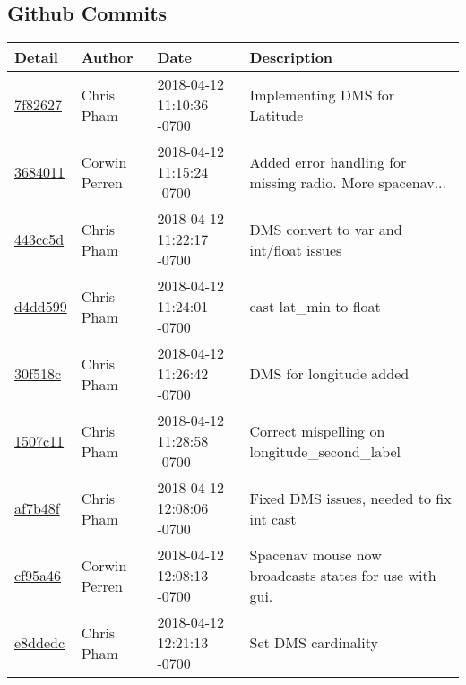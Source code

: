 \subsection{Github Commits}
\begin{center}
\begin{tabular}{l l l l}	\textbf{Detail} & \textbf{Author} & \textbf{Date} &\textbf{Description}\\\hline
\href{https://github.com/OSURoboticsClub/Rover_2017_2018/commit/7f826271356542813ed582df922494ed1595ed87}{7f82627} & Chris Pham & 2018-04-12 11:10:36 -0700 &Implementing DMS for Latitude\\\hline
\href{https://github.com/OSURoboticsClub/Rover_2017_2018/commit/368401176b22f21268aa00b85bc7afa9b1003331}{3684011} & Corwin Perren & 2018-04-12 11:15:24 -0700 &Added error handling for missing radio. More spacenav...\\\hline
\href{https://github.com/OSURoboticsClub/Rover_2017_2018/commit/443cc5dd837567b0335bea229a4b5a567d3e83e7}{443cc5d} & Chris Pham & 2018-04-12 11:22:17 -0700 &DMS convert to var and int/float issues\\\hline
\href{https://github.com/OSURoboticsClub/Rover_2017_2018/commit/d4dd59937809087ae7c64bc3362b069188989fcd}{d4dd599} & Chris Pham & 2018-04-12 11:24:01 -0700 &cast lat\_min to float\\\hline
\href{https://github.com/OSURoboticsClub/Rover_2017_2018/commit/30f518c34ffc146cc0082baeec1843f22c15095b}{30f518c} & Chris Pham & 2018-04-12 11:26:42 -0700 &DMS for longitude added\\\hline
\href{https://github.com/OSURoboticsClub/Rover_2017_2018/commit/1507c11f47d642aae6fc2490f2e9bb3098a19501}{1507c11} & Chris Pham & 2018-04-12 11:28:58 -0700 &Correct mispelling on longitude\_second\_label\\\hline
\href{https://github.com/OSURoboticsClub/Rover_2017_2018/commit/af7b48f19a5b8e6ea94ddbe9cf944453d160f7af}{af7b48f} & Chris Pham & 2018-04-12 12:08:06 -0700 &Fixed DMS issues, needed to fix int cast\\\hline
\href{https://github.com/OSURoboticsClub/Rover_2017_2018/commit/cf95a46c7dd4fce46380bb2942564b245b727d3a}{cf95a46} & Corwin Perren & 2018-04-12 12:08:13 -0700 &Spacenav mouse now broadcasts states for use with gui.\\\hline
\href{https://github.com/OSURoboticsClub/Rover_2017_2018/commit/e8ddedcf42e3a503bfff4d978d49cea8a7119663}{e8ddedc} & Chris Pham & 2018-04-12 12:21:13 -0700 &Set DMS cardinality\\\hline

\end{tabular}
\end{center}
